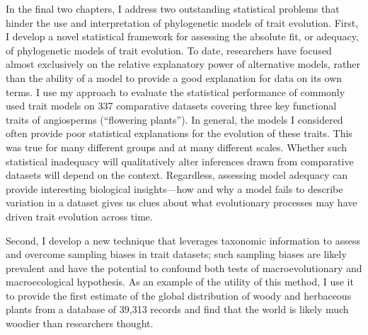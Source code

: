 In the final two chapters, I address two outstanding statistical problems that hinder the use and interpretation of phylogenetic models of trait evolution. First, I develop a novel statistical framework for assessing the absolute fit, or adequacy, of phylogenetic models of trait evolution. To date, researchers have focused almost exclusively on the relative explanatory power of alternative models, rather than the ability of a model to provide a good explanation for data on its own terms. I use my approach to evaluate the statistical performance of commonly used trait models on 337 comparative datasets covering three key functional traits of angiosperms (``flowering plants''). In general, the models I considered often provide poor statistical explanations for the evolution of these traits. This was true for many different groups and at many different scales.  Whether such statistical inadequacy will qualitatively alter inferences drawn from comparative datasets will depend on the context. Regardless, assessing model adequacy can provide interesting biological insights---how and why a model fails to describe variation in a dataset gives us clues about what evolutionary processes may have driven trait evolution across time.

Second, I develop a new technique that leverages taxonomic information to assess and overcome sampling biases in trait datasets; such sampling biases are likely prevalent and have the potential to confound both tests of macroevolutionary and macroecological hypothesis. As an example of the utility of this method, I use it to provide the first estimate of the global distribution of woody and herbaceous plants from a database of 39,313 records and find that the world is likely much woodier than researchers thought. 


